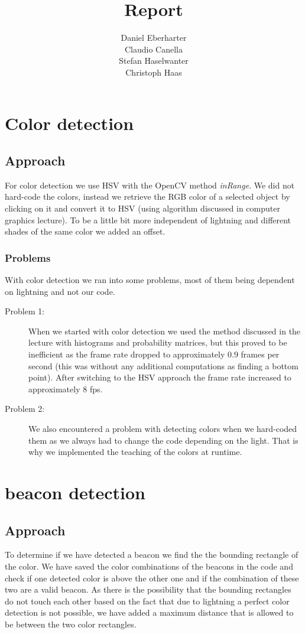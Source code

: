 \documentclass[703031]{iisreport}
\title{Report}
\author{Daniel Eberharter\\ Claudio Canella\\ Stefan Haselwanter\\ Christoph Haas}
\begin{document}
\maketitle

\section{Color detection}
\subsection{Approach}
For color detection we use HSV with the OpenCV method \emph{inRange}. We did not hard-code the colors, instead we retrieve the RGB color of a selected object by clicking on it and convert it to HSV (using algorithm discussed in computer graphics lecture). To be a little bit more independent of lightning and different shades of the same color we added an offset.
\subsubsection{Problems}
With color detection we ran into some problems, most of them being dependent on lightning and not our code.
	\begin{description}
		\item [Problem 1:] When we started with color detection we used the method discussed in the lecture with histograms and probability matrices, but this proved to be inefficient as the frame rate dropped to approximately 0.9 frames per second (this was without any additional computations as finding a bottom point). After switching to the HSV approach the frame rate increased to approximately 8 fps.
		\item [Problem 2:] We also encountered a problem with detecting colors when we hard-coded them as we always had to change the code depending on the light. That is why we implemented the teaching of the colors at runtime. \label{Color-Teaching}
	\end{description}

\section{beacon detection}
\subsection{Approach}
To determine if we have detected a beacon we find the the bounding rectangle of the color. We have saved the color combinations of the beacons in the code and check if one detected color is above the other one and if the combination of these two are a valid beacon. As there is the possibility that the bounding rectangles do not touch each other based on the fact that due to lightning a perfect color detection is not possible, we have added a maximum distance that is allowed to be between the two color rectangles.
\end{document}
